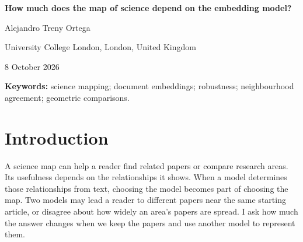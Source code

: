 \documentclass[12pt]{article}
\begin{document}
\begin{center}
{\LARGE\bfseries How much does the map of science depend on the embedding model?\par}
\vspace{12pt}
{\large Alejandro Treny Ortega\par}
\smallskip
University College London, London, United Kingdom\par
\medskip
{\small 8 October 2026\par}
\end{center}

\begin{abstract}
Science maps describe relationships between papers. Text embedding models build these relationships by turning a paper's text into a list of numbers that gives it a position. Would another model give the same picture? I compare ten models using titles and abstracts of 500,000 publications from the OpenAlex bibliographic catalogue, published in 2000--2024 across 26 disciplines, including Medicine and Physics. Representing each discipline by its papers' average position produces similar arrangements across models, including when other papers are selected. Yet within a discipline and period, two models share, on average, only eight of the 25 papers closest to a given paper. Supplying titles alone also changes much of that list, with effects that vary between models. Models can also disagree about which discipline's papers are more spread out. One measure of spread compares angles between lines drawn from a common point to each paper's position. Moving that point can reverse which discipline appears more spread out, even when selecting other papers leaves the answer unchanged. The broad arrangement can remain similar while answers about nearby papers and differences between disciplines depend on the model, the text it receives and how its output is processed.
\end{abstract}
\textbf{Keywords:} science mapping; document embeddings; robustness; neighbourhood agreement; geometric comparisons.

\section{Introduction}
A science map can help a reader find related papers or compare research areas. Its usefulness depends on the relationships it shows. When a model determines those relationships from text, choosing the model becomes part of choosing the map. Two models may lead a reader to different papers near the same starting article, or disagree about how widely an area's papers are spread. I ask how much the answer changes when we keep the papers and use another model to represent them.
\end{document}
